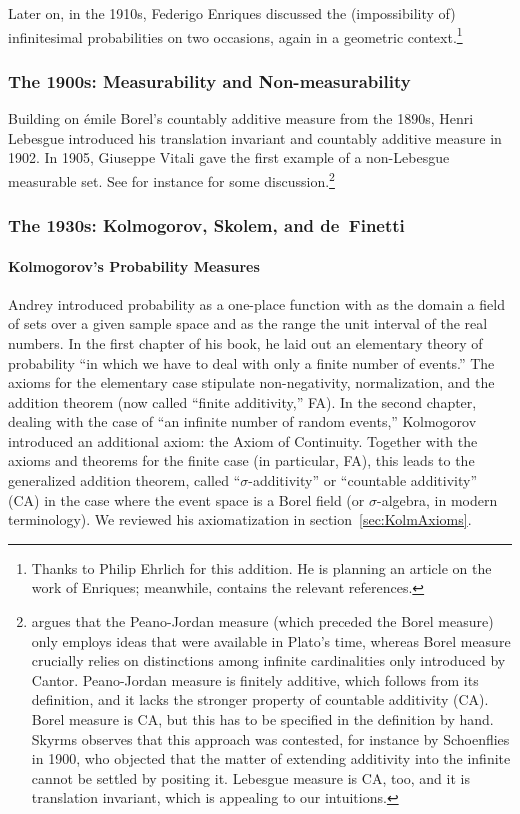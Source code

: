 Later on, in the 1910s, Federigo Enriques discussed the (impossibility of) infinitesimal probabilities on two occasions, again in a geometric context.\footnote{Thanks to Philip Ehrlich for this addition. He is planning an article on the work of Enriques; meanwhile, \citet{Ehrlich:2006} contains the relevant references.}

\subsubsection*{The 1900s: Measurability and Non-measurability}
Building on {\'{e}}mile Borel's countably additive measure from the 1890s, Henri Lebesgue introduced his translation invariant and countably additive measure in 1902. In 1905, Giuseppe Vitali gave the first example of a non-Lebesgue measurable set. See for instance \citet{Skyrms:1983a} for some discussion.\footnote{\citet{Skyrms:1983a} argues that the Peano-Jordan measure (which preceded the Borel measure) only employs ideas that were available in Plato's time, whereas Borel measure crucially relies on distinctions among infinite cardinalities only introduced by Cantor. Peano-Jordan measure is finitely additive, which follows from its definition, and it lacks the stronger property of countable additivity (CA). Borel measure is CA, but this has to be specified in the definition by hand. Skyrms observes that this approach was contested, for instance by Schoenflies in 1900, who objected that the matter of extending additivity into the infinite cannot be settled by positing it. Lebesgue measure is CA, too, and it is translation invariant, which is appealing to our intuitions.\label{fn:Schoenflies}}

\subsubsection*{The 1930s: Kolmogorov, Skolem, and de~Finetti}

\paragraph{Kolmogorov's Probability Measures}\label{sec:Kolmogorov}
Andrey \citet{Kolmogorov:1933} introduced probability as a one-place function with as the domain a field of sets over a given sample space and as the range the unit interval of the real numbers. In the first chapter of his book, he laid out an elementary theory of probability ``in which we have to deal with only a finite number of events.'' The axioms for the elementary case stipulate non-negativity, normalization, and the addition theorem (now called ``finite additivity,'' FA).
In the second chapter, dealing with the case of ``an infinite number of random events,'' Kolmogorov introduced an additional axiom: the Axiom of Continuity. Together with the axioms and theorems for the finite case (in particular, FA), this leads to the generalized addition theorem, called ``$\sigma $-additivity'' or ``countable additivity'' (CA) in the case where the event space is a Borel field (or $\sigma $-algebra, in modern terminology). We reviewed his axiomatization in section~\ref{sec:KolmAxioms}.

